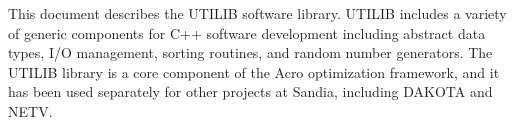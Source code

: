 This document describes the UTILIB software library.  UTILIB includes a
variety of generic components for C++ software development including
abstract data types, I/O management, sorting routines, and random number
generators.  The UTILIB library is a core component of the Acro optimization
framework, and it has been used separately for other projects at Sandia,
including DAKOTA and NETV.
